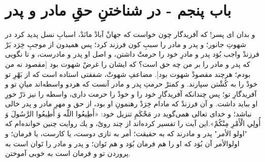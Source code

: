 \section*{باب پنجم - در شناختنِ حقِ مادر و پدر}

و بدان اى پسر! كه آفريدگار چون خواست كه جهانْ آبادْ مانَدْ، اسبابِ نسل پديد كرد در شهوتِ جانور؛ و پدر و مادر را سببِ كون فرزند كرد؛ پس هميدون از موجبِ خِرَد بَرْ فرزندْ واجب بُوَد پدر و مادرِ خود را حرمتْ داشتن، و اصل او پدر و مادرست، و تا نگويى كه پدر و مادر را بر من چه حق است‌؟ كه ايشان را غرضْ  شهوت بود [مقصود نه من بودم؛ هرچند مقصودْ شهوت بود]. مضاعفِ شهوتْ، شفقتى استاده است كه از بَهْرِ تو خودْ را به كُشْتن سپارند. و كمترْ حرمتِ پدر و مادر آنست كه هردو واسطه‌اند ميانِ تو و آفريدگارِ تو؛ پس چندانكه آفريدگارِ خود را و خودْ را حرمت دارى، واسطه را نيز دَرْ خورِ او ببايد داشت. و آن فرزندْ كه مادام  خِرَدْ رهنمونِ او بود، از حق و مهرِ مادر و پدر خالى نباشد؛ و خداى تعالى همى‌گويد در مَحْكَمِ تنزيل خود: «أَطِيعُوا اللّه وَ أَطِيعُوا الرَّسُولَ وَ أُولِي الْأَمْرِ مِنْكُمْ».اين آيت را تفسير كرده‌اند از چند روىْ، و يك روايت چنين خوانده‌ام كه "اولو الأمر" پدر و مادرند كه به حقيقت؛ أمر به تازى دوست، يا كارست، يا فرمان؛ و اولوالأمر آن بُوَد كه او را هم فرمان بُوَد و هم تَوان؛ و پدر و مادر را تَوان است به پروردن تو و فرمان است به خوبى آموختن.



